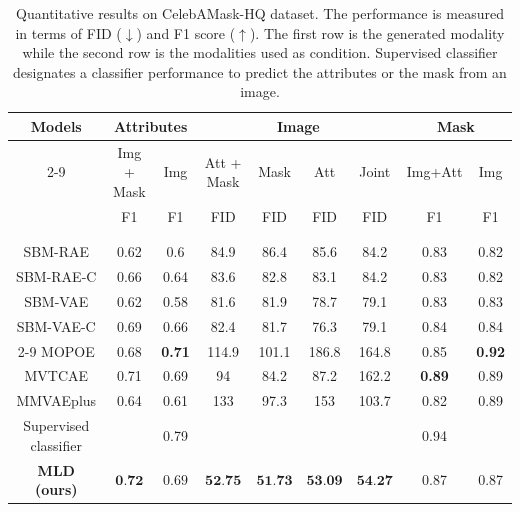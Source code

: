 \begin{table}[H]
\tiny
\centering
\begin{tabular}{c|cc|cccc|cc}
\toprule
\multirow{3}{*}{ Models }  & \multicolumn{2}{c}{ Attributes }  &  \multicolumn{4}{c}{Image }  &  \multicolumn{2}{c}{Mask } \\
    \cmidrule{2-9}
    &  Img + Mask & Img &  Att + Mask & Mask  & Att & Joint & Img+Att & Img \\
   
    &  F1 & F1 &  FID  & FID  & FID & FID & F1  & F1 \\
     \midrule
     \\
     \cite{wesego2023scorebased} 
     \\
     SBM-RAE  & 0.62 & 0.6 & 84.9& 86.4 & 85.6& 84.2 & 0.83 & 0.82
    \\
     SBM-RAE-C & 0.66 & 0.64& 83.6& 82.8& 83.1& 84.2 & 0.83 & 0.82
     \\
     SBM-VAE& 0.62 & 0.58 & 81.6& 81.9 & 78.7&79.1& 0.83 & 0.83
     \\
     SBM-VAE-C& 0.69 & 0.66 & 82.4& 81.7 & 76.3& 79.1 & 0.84 & 0.84

     \\
          \cmidrule{2-9}
     \gls{MOPOE} & 0.68 & \textbf{0.71} &114.9 & 101.1 &186.8 & 164.8 & 0.85 & \textbf{0.92}
     \\
      \gls{MVTCAE} & 0.71 & 0.69 & 94 & 84.2 &87.2 & 162.2 &\textbf{0.89} & 0.89
      \\
    \gls{MMVAEplus} & 0.64 & 0.61 &133 & 97.3 & 153 &103.7 & 0.82 & 0.89 \\
     \midrule
   Supervised classifier &   &
   0.79  & &  &   &  & 0.94 \\
  \midrule
\textbf{ \gls{MLD} (ours) } & 
 $ \textbf{0.72}$&
 $0.69$ &

 $\textbf{52.75}$ & 
    $\textbf{51.73}$ & 
    $\textbf{53.09}$ &
 $\textbf{54.27}$ 
 & 0.87 & 0.87 \\
    \bottomrule

\end{tabular}
\caption{Quantitative results on CelebAMask-HQ dataset. The performance is measured in terms of \gls{FID} ($ \downarrow $) and F1 score ($ \uparrow $). The first row is the generated modality while the second row is the modalities used as condition.
Supervised classifier designates a classifier performance to predict the attributes or the mask from an image. }
\label{coh_qua:celebA}

 \end{table}



